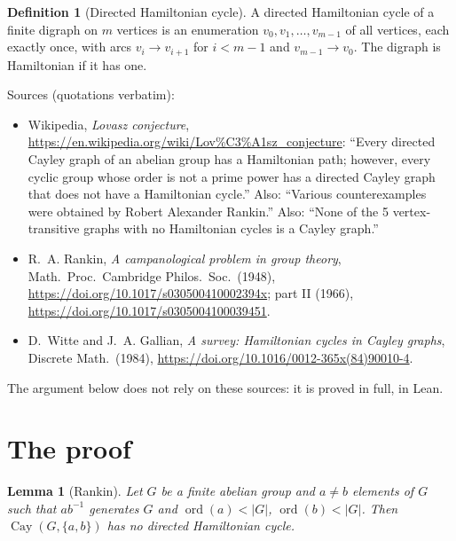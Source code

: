 \documentclass[11pt]{article}
\newtheorem{lemma}[theorem]{Lemma}
\theoremstyle{definition}
\newtheorem{definition}[theorem]{Definition}
\theoremstyle{remark}
\renewcommand{\_}{\oldus\allowbreak}
\newcommand{\Cay}{\operatorname{Cay}}
\newcommand{\ord}{\operatorname{ord}}
\begin{document}
\begin{definition}[Directed Hamiltonian cycle]
A directed Hamiltonian cycle of a finite digraph on $m$ vertices is an enumeration
$v_0, v_1, \dots, v_{m-1}$ of all vertices, each exactly once, with arcs $v_i \to v_{i+1}$ for
$i < m-1$ and $v_{m-1} \to v_0$. The digraph is Hamiltonian if it has one.
\end{definition}

Sources (quotations verbatim):
\begin{itemize}
\item Wikipedia, \emph{Lovasz conjecture},
  \url{https://en.wikipedia.org/wiki/Lov%C3%A1sz_conjecture}: ``Every directed Cayley graph of an
  abelian group has a Hamiltonian path; however, every cyclic group whose order is not a prime power has
  a directed Cayley graph that does not have a Hamiltonian cycle.'' Also: ``Various counterexamples were
  obtained by Robert Alexander Rankin.'' Also: ``None of the 5 vertex-transitive graphs with no
  Hamiltonian cycles is a Cayley graph.''
\item R.~A. Rankin, \emph{A campanological problem in group theory}, Math.\ Proc.\ Cambridge Philos.\
  Soc.\ (1948), \url{https://doi.org/10.1017/s030500410002394x}; part II (1966),
  \url{https://doi.org/10.1017/s0305004100039451}.
\item D.~Witte and J.~A. Gallian, \emph{A survey: Hamiltonian cycles in Cayley graphs}, Discrete Math.\
  (1984), \url{https://doi.org/10.1016/0012-365x(84)90010-4}.
\end{itemize}
The argument below does not rely on these sources: it is proved in full, in Lean.

\section{The proof}

\begin{lemma}[Rankin]\label{lem:rankin}
Let $G$ be a finite abelian group and $a \neq b$ elements of $G$ such that $ab^{-1}$ generates $G$ and
$\ord(a) < |G|$, $\ord(b) < |G|$. Then $\Cay(G,\{a,b\})$ has no directed Hamiltonian cycle.
\end{lemma}
\end{document}
